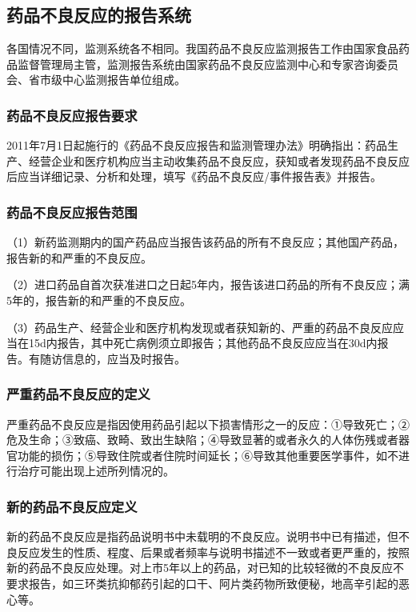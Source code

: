 \subsection{药品不良反应的报告系统}

各国情况不同，监测系统各不相同。我国药品不良反应监测报告工作由国家食品药品监督管理局主管，监测报告系统由国家药品不良反应监测中心和专家咨询委员会、省市级中心监测报告单位组成。

\subsubsection{药品不良反应报告要求}

2011年7月1日起施行的《药品不良反应报告和监测管理办法》明确指出：药品生产、经营企业和医疗机构应当主动收集药品不良反应，获知或者发现药品不良反应后应当详细记录、分析和处理，填写《药品不良反应/事件报告表》并报告。

\subsubsection{药品不良反应报告范围}

（1）新药监测期内的国产药品应当报告该药品的所有不良反应；其他国产药品，报告新的和严重的不良反应。

（2）进口药品自首次获准进口之日起5年内，报告该进口药品的所有不良反应；满5年的，报告新的和严重的不良反应。

（3）药品生产、经营企业和医疗机构发现或者获知新的、严重的药品不良反应应当在15d内报告，其中死亡病例须立即报告；其他药品不良反应应当在30d内报告。有随访信息的，应当及时报告。

\subsubsection{严重药品不良反应的定义}

严重药品不良反应是指因使用药品引起以下损害情形之一的反应：①导致死亡；②危及生命；③致癌、致畸、致出生缺陷；④导致显著的或者永久的人体伤残或者器官功能的损伤；⑤导致住院或者住院时间延长；⑥导致其他重要医学事件，如不进行治疗可能出现上述所列情况的。

\subsubsection{新的药品不良反应定义}

新的药品不良反应是指药品说明书中未载明的不良反应。说明书中已有描述，但不良反应发生的性质、程度、后果或者频率与说明书描述不一致或者更严重的，按照新的药品不良反应处理。对上市5年以上的药品，对已知的比较轻微的不良反应不要求报告，如三环类抗抑郁药引起的口干、阿片类药物所致便秘，地高辛引起的恶心等。

